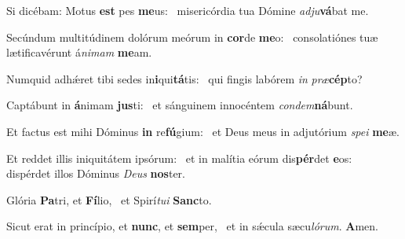 \item Si dicébam: Motus \textbf{est} pes \textbf{me}us:~\psstar{} misericórdia tua Dómine \textit{adju}\textbf{vá}bat me.
\item Secúndum multitúdinem dolórum meórum in \textbf{cor}de \textbf{me}o:~\psstar{} consolatiónes tuæ lætificavérunt á\textit{nimam} \textbf{me}am.
\item Numquid adhǽret tibi sedes in\textbf{i}qui\textbf{tá}tis:~\psstar{} qui fingis labórem \textit{in} \textit{præ}\textbf{cép}to?
\item Captábunt in \textbf{á}nimam \textbf{jus}ti:~\psstar{} et sánguinem innocéntem \textit{condem}\textbf{ná}bunt.
\item Et factus est mihi Dóminus \textbf{in} re\textbf{fú}gium:~\psstar{} et Deus meus in adjutórium \textit{spei} \textbf{me}æ.
\item Et reddet illis iniquitátem ipsórum:~\pscross{} et in malítia eórum dis\textbf{pér}det \textbf{e}os:~\psstar{} dispérdet illos Dóminus \textit{Deus} \textbf{nos}ter.
\item Glória \textbf{Pa}tri, et \textbf{Fí}lio,~\psstar{} et Spirí\textit{tui} \textbf{Sanc}to.
\item Sicut erat in princípio, et \textbf{nunc}, et \textbf{sem}per,~\psstar{} et in sǽcula sæcu\textit{lórum}. \textbf{A}men.